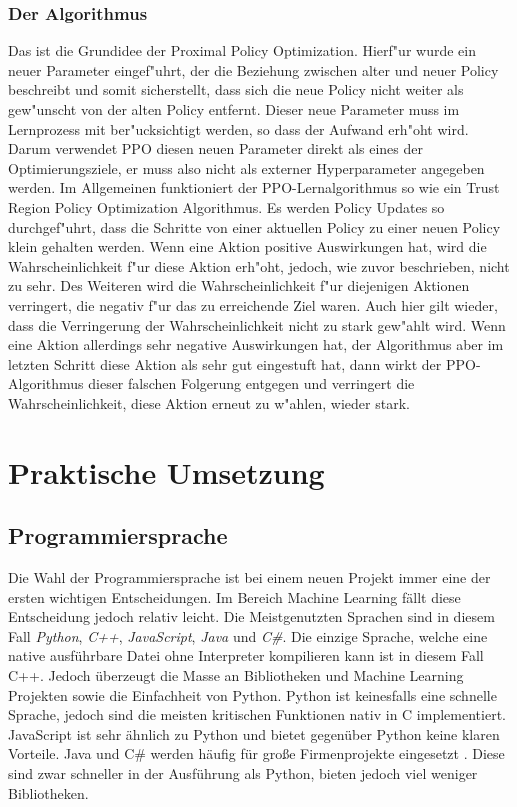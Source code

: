 \documentclass[12pt,a4paper]{article}
\begin{document}
\subsubsection{Der Algorithmus}
Das ist die Grundidee der Proximal Policy Optimization.
Hierf"ur wurde ein neuer Parameter eingef"uhrt, der die Beziehung zwischen alter und neuer Policy beschreibt und somit sicherstellt, dass sich die neue Policy nicht weiter als gew"unscht von der alten Policy entfernt.
Dieser neue Parameter muss im Lernprozess mit ber"ucksichtigt werden, so dass der Aufwand erh"oht wird. Darum verwendet PPO diesen neuen Parameter direkt als eines der Optimierungsziele, er muss also nicht als externer Hyperparameter angegeben werden.
\newline
Im Allgemeinen funktioniert der PPO-Lernalgorithmus so wie ein Trust Region Policy Optimization Algorithmus. Es werden Policy Updates so durchgef"uhrt, dass die Schritte von einer aktuellen Policy zu einer neuen Policy klein gehalten werden.
Wenn eine Aktion positive Auswirkungen hat, wird die Wahrscheinlichkeit f"ur diese Aktion erh"oht, jedoch, wie zuvor beschrieben, nicht zu sehr.
Des Weiteren wird die Wahrscheinlichkeit f"ur diejenigen Aktionen verringert, die negativ f"ur das zu erreichende Ziel waren. Auch hier gilt wieder, dass die Verringerung der Wahrscheinlichkeit nicht zu stark gew"ahlt wird.
Wenn eine Aktion allerdings sehr negative Auswirkungen hat, der Algorithmus aber im letzten Schritt diese Aktion als sehr gut eingestuft hat, dann wirkt der PPO-Algorithmus dieser falschen Folgerung entgegen und verringert die Wahrscheinlichkeit, diese Aktion erneut zu w"ahlen, wieder stark.\cite{schuh:2017}



\section{Praktische Umsetzung}
\subsection{Programmiersprache}
Die Wahl der Programmiersprache ist bei einem neuen Projekt immer eine der ersten wichtigen Entscheidungen.
Im Bereich Machine Learning fällt diese Entscheidung jedoch relativ leicht.
Die Meistgenutzten Sprachen sind in diesem Fall \textit{Python}, \textit{C++}, \textit{JavaScript}, \textit{Java} und \textit{C\#}.
Die einzige Sprache, welche eine native ausführbare Datei ohne Interpreter kompilieren kann ist in diesem Fall C++.
Jedoch überzeugt die Masse an Bibliotheken und Machine Learning Projekten sowie die Einfachheit von Python.
Python ist keinesfalls eine schnelle Sprache, jedoch sind die meisten kritischen Funktionen nativ in C implementiert.
JavaScript ist sehr ähnlich zu Python und bietet gegenüber Python keine klaren Vorteile.
Java und C\# werden häufig für große Firmenprojekte eingesetzt \cite{github:blog:ml_langs}.
Diese sind zwar schneller in der Ausführung als Python, bieten jedoch viel weniger Bibliotheken.
\end{document}
